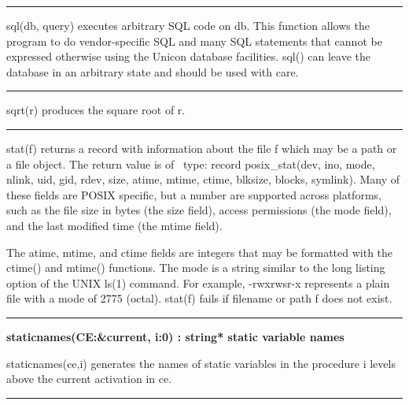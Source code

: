 \bigskip\hrule\vspace{0.1cm}

\noindent
{}\textsf{sql(db, query)} executes arbitrary SQL code on
\textsf{db}. This function allows the program to do vendor-specific SQL
and many SQL statements that cannot be expressed otherwise using the
Unicon database facilities. \textsf{sql()} can leave the database in an
arbitrary state and should be used with care.

\bigskip\hrule\vspace{0.1cm}

\noindent
{}\textsf{sqrt(r)} produces the square root of
\textsf{r}.

\bigskip\hrule\vspace{0.1cm}

\noindent
{}\textsf{stat(f)} returns a record
with information about the file \textsf{f} which may be a path or a
file object. The return value is of \ type: \textsf{record
posix\_stat(dev, ino, mode, nlink, uid, gid, rdev, size, atime, mtime,
ctime, blksize, blocks, symlink)}. Many of these fields are POSIX
specific, but a number are supported across platforms, such as the
file size in bytes (the \textsf{size} field), access
permissions (the \textsf{mode} field), and the last modified time (the
\textsf{mtime} field).

The \textsf{atime}, \textsf{mtime}, and \textsf{ctime} fields are
integers that may be formatted with the \textsf{ctime()} and
\textsf{mtime()} functions. The mode is a string similar to the long
listing option of the UNIX \textsf{ls(1)} command. For example,
\textsf{{\textquotedbl}-rwxrwsr-x{\textquotedbl}} represents a plain
file with a mode of 2775 (octal). \textsf{stat(f)} fails if filename or
path \textsf{f} does not exist.

\bigskip\hrule\vspace{0.1cm}
\noindent
{\bf staticnames(CE:\&current, i:0) : string* \hfill static variable names}

\noindent
{}\textsf{staticnames(ce,i)} generates the names of static
variables in the procedure \textsf{i} levels above the current
activation in \textsf{ce}.

\bigskip\hrule\vspace{0.1cm}


